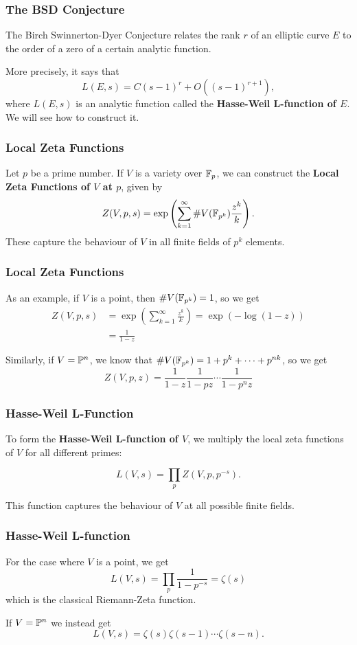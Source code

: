 \documentclass{beamer}
\begin{document}
\begin{frame}
  \frametitle{The BSD Conjecture}
  The Birch Swinnerton-Dyer Conjecture relates the rank $r$ of an elliptic
  curve $E$ to the order of a zero of a certain analytic function. \pause

  More precisely, it says that
  \[L(E,s) = C (s-1)^r + O((s-1)^{r+1}),\]
  where $L(E,s)$ is an analytic function called the \textbf{Hasse-Weil
    L-function of $E$}. We will see how to construct it.
\end{frame}
 
\begin{frame}
  \frametitle{Local Zeta Functions}
  Let $p$ be a prime number.
  If $V$ is a variety over $\mathbb{F}_p$, we can construct the \textbf{Local Zeta
    Functions of $V$ at $p$}, given by
  \[Z(V,p,s) = \exp \left( \sum\limits_{k=1}^\infty \# V(\mathbb{F}_{p^k})
      \frac{z^k}{k} \right).\] \pause
  These capture the behaviour of $V$ in all finite fields of $p^k$ elements.
\end{frame}

\begin{frame}
  \frametitle{Local Zeta Functions}
  As an example, if $V$ is a point, then $\# V(\mathbb{F}_{p^k}) = 1$, so we get
  \begin{equation*}
    \begin{split}
      Z(V,p,s) &= \exp \left( \sum\limits_{k=1}^\infty \frac{z^k}{k} \right)
      = \exp \left( -\log (1-z) \right) \\
      &= \frac{1}{1-z}
    \end{split}
  \end{equation*} \pause

  Similarly, if $V = {\mathbb P}^n$, we know that $\# V(\mathbb{F}_{p^k}) = 1 + p^k + \cdots +
  p^{nk}$, so we get 
  \[Z(V,p,z) = \frac{1}{1-z} \frac{1}{1-pz}\cdots \frac{1}{1-p^nz}\]
\end{frame} 

\begin{frame}
  \frametitle{Hasse-Weil L-Function}
  To form the \textbf{Hasse-Weil L-function of $V$},
  we multiply the local zeta functions
  of $V$ for all different primes:

  \[L(V,s) = \prod\limits_p Z(V,p,p^{-s}).\] \pause

  This function captures the behaviour of $V$ at all possible finite fields.

\end{frame}

\begin{frame}
  \frametitle{Hasse-Weil L-function}
  For the case where $V$ is a point, we get
  \[L(V,s) = \prod \limits_p \frac{1}{1-p^{-s}} = \zeta(s)\]
  which is the classical Riemann-Zeta function. \pause 

  If $V = {\mathbb P}^n$ we instead get
  \[L(V,s) = \zeta(s) \zeta(s-1) \cdots \zeta (s-n).\]
\end{frame}
\end{document}
